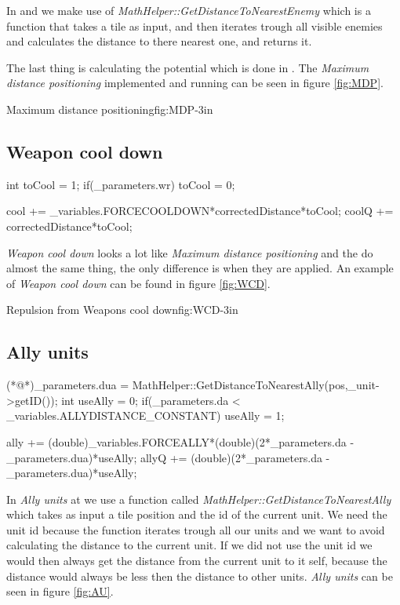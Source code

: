 	In  and  we make use of \textit{MathHelper::GetDistanceToNearestEnemy} which is a function that takes a tile as input, and then iterates trough all visible enemies and calculates the distance to there nearest one, and returns it.
	
	The last thing is calculating the potential which is done in . The \textit{Maximum distance positioning} implemented and running can be seen in figure \ref{fig:MDP}.

	
			{Maximum distance positioning}{fig:MDP}{-3in}

	\subsection{Weapon cool down}
		\begin{Sourcecode}[caption=Weapon cool down]
int toCool = 1;
if(_parameters.wr)
	toCool = 0;
	
cool += _variables.FORCECOOLDOWN*correctedDistance*toCool;
coolQ += correctedDistance*toCool;
\end{Sourcecode}	
	\textit{Weapon cool down} looks a lot like \textit{Maximum distance positioning} and the do almost the same thing, the only difference is when they are applied. An example of \textit{Weapon cool down} can be found in figure \ref{fig:WCD}.
	
		{Repulsion from Weapons cool down}{fig:WCD}{-3in}

	\subsection{Ally units}
		\begin{Sourcecode}[caption=Ally units]
(*@\lnote@*)_parameters.dua = MathHelper::GetDistanceToNearestAlly(pos,_unit->getID());
int useAlly = 0;
if(_parameters.da < _variables.ALLYDISTANCE_CONSTANT)
	useAlly = 1;

ally += (double)_variables.FORCEALLY*(double)(2*_parameters.da - _parameters.dua)*useAlly;
allyQ += (double)(2*_parameters.da - _parameters.dua)*useAlly;
\end{Sourcecode}	
	In \textit{Ally units} at  we use a function called \textit{MathHelper::GetDistanceToNearestAlly} which takes as input a tile position and the id of the current unit. We need the unit id because the function iterates trough all our units and we want to avoid calculating the distance to the current unit. If we did not use the unit id we would then always get the distance from the current unit to it self, because the distance would always be less then the distance to other units. \textit{Ally units} can be seen in figure \ref{fig:AU}.
	
